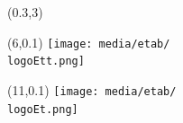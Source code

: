 \documentclass[a4paper]{article}
\newcommand{\NNT}{20XXSACLXXXX} 															%
\newcommand{\logoEt}{etab} 																%
\newcommand{\vpos}{0.1}																	%
\newcommand{\hpos}{11}																		%
\newcommand{\logoEtt}{etab2}  																%
\newcommand{\vpostt}{0.1} 																	%
\newcommand{\hpostt}{6}																	%
\begin{document}
\begin{textblock}{1}(0.3,3)
	\Large{\rotatebox{90}{\color{white}{NNT : \NNT}}}
\end{textblock}


                            

\begin{textblock}{1}(\hpostt,\vpostt)
	\texttt{[image: media/etab/\\logoEtt.png]}
\end{textblock}

\begin{textblock}{1}(\hpos,\vpos)
		\texttt{[image: media/etab/\\logoEt.png]}	
\end{textblock}

\end{document}
